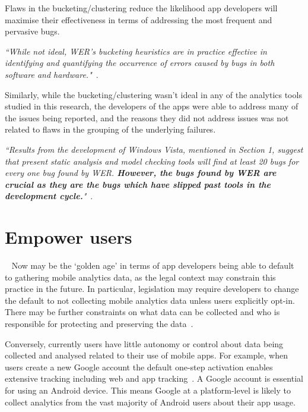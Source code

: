 Flaws in the bucketing/clustering reduce the likelihood app developers will maximise their effectiveness in terms of addressing the most frequent and pervasive bugs.


\emph{``While not ideal, WER's bucketing heuristics are in practice effective in identifying and quantifying the occurrence of errors caused by bugs in both software and hardware."}~.


Similarly, while the bucketing/clustering wasn't ideal in any of the analytics tools studied in this research, the developers of the apps were able to address many of the issues being reported, and the reasons they did not address issues was not related to flaws in the grouping of the underlying failures.


\emph{``Results from the development of Windows Vista, mentioned in Section 1, suggest that present static analysis and model checking tools will find at least 20 bugs for every one bug found by WER. \textbf{However, the bugs found by WER are crucial as they are the bugs which have slipped past tools in the development cycle.}"}~.


\section{Empower users}~\label{discussion-empower-users}
Now may be the ‘golden age’ in terms of app developers being able to default to gathering mobile analytics data, as the legal context may constrain this practice in the future. In particular, legislation may require developers to change the default to not collecting mobile analytics data unless users explicitly opt-in. There may be further constraints on what data can be collected and who is responsible for protecting and preserving the data~. 

Conversely, currently users have little autonomy or control about data being collected and analysed related to their use of mobile apps. For example, when users create a new Google account the default one-step activation enables extensive tracking including web and app tracking~. A Google account is essential for using an Android device. %
This means Google at a platform-level is likely to collect analytics from the vast majority of Android users about their app usage. 

